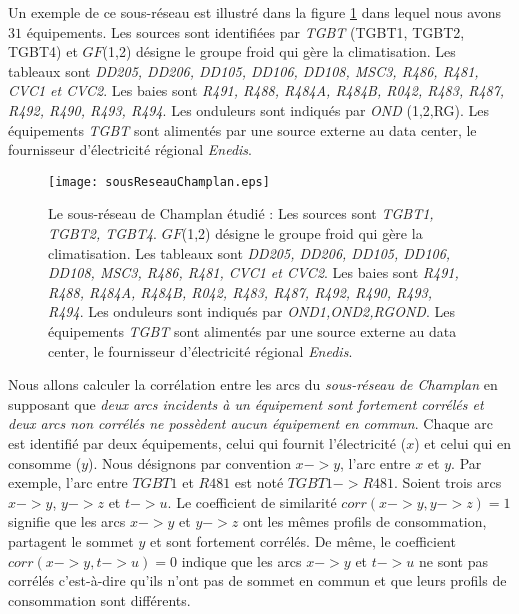 Un exemple de ce sous-r\'eseau est illustr\'e dans la figure \ref{sousReseauChamplan} dans lequel nous avons $31$ \'equipements. Les sources sont identifi\'ees par {\em TGBT} (TGBT1, TGBT2, TGBT4) et $GF$(1,2) d\'esigne le groupe froid qui g\`ere la climatisation. Les tableaux sont {\em DD205, DD206, DD105, DD106, DD108, MSC3, R486, R481, CVC1 et CVC2}. Les baies sont {\em R491, R488, R484A, R484B, R042, R483, R487, R492, R490, R493, R494}. Les onduleurs sont indiqu\'es par {\em OND} (1,2,RG). Les \'equipements {\em TGBT} sont aliment\'es par une source externe au data center, le fournisseur d'\'electricit\'e r\'egional {\em Enedis}.  
\begin{figure}[htb!] 
\centering
\texttt{[image: sousReseauChamplan.eps]}
\caption{Le sous-r\'eseau de Champlan \'etudi\'e : Les sources sont {\em TGBT1, TGBT2, TGBT4}. $GF$(1,2) d\'esigne le groupe froid qui g\`ere la climatisation. 
Les tableaux sont {\em DD205, DD206, DD105, DD106, DD108, MSC3, R486, R481, CVC1 et CVC2}. 
Les baies sont {\em R491, R488, R484A, R484B, R042, R483, R487, R492, R490, R493, R494}. Les onduleurs sont indiqu\'es par {\em OND1,OND2,RGOND}. 
Les \'equipements {\em TGBT} sont aliment\'es par une source externe au data center, le fournisseur d'\'electricit\'e r\'egional {\em Enedis}.
}
\label{sousReseauChamplan}
\end{figure}
\newline

Nous allons calculer la corr\'elation entre les arcs du {\em sous-r\'eseau de Champlan} en supposant que {\em deux arcs incidents \`a un \'equipement sont fortement corr\'el\'es et deux arcs non corr\'el\'es ne poss\`edent aucun \'equipement en commun}.
Chaque arc est identifi\'e par deux \'equipements, celui qui fournit l'\'electricit\'e ($x$) et celui qui en consomme ($y$). Nous d\'esignons par convention $x->y$, l'arc entre $x$ et $y$. Par exemple, l'arc entre $TGBT1$ et $R481$ est not\'e $TGBT1->R481$. 
\newline
Soient trois arcs $x->y$, $y->z$ et $t->u$. 
Le coefficient de similarit\'e $corr(x->y,y->z) = 1$ signifie que les arcs $x->y$ et $y->z$  ont les m\^emes profils de consommation, partagent le sommet $y$ et sont fortement corr\'el\'es. De m\^eme, le coefficient $corr(x->y,t->u) = 0$ indique que les arcs  $x->y$ et $t->u$ ne sont pas corr\'el\'es c'est-\`a-dire qu'ils n'ont pas de sommet en commun et que leurs profils de consommation sont diff\'erents.
\newline

